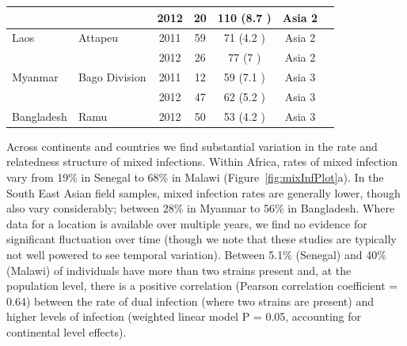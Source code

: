\documentclass[9pt,lineno]{elife}
\begin{document}
\begin{table}[bt]
\begin{tabular}{l l c c c c c}
                &               &2012 &20   &110  (8.7 )&Asia 2  \\
 \hline
Laos            &Attapeu        &2011 &59   &71   (4.2 )&Asia 2  \\
                &               &2012 &26   &77   (7   )&Asia 2  \\
 \hline
Myanmar         &Bago Division  &2011 &12   &59   (7.1 )&Asia 3  \\
                &               &2012 &47   &62   (5.2 )&Asia 3  \\
 \hline
Bangladesh      &Ramu           &2012 &50   &53   (4.2 )&Asia 3  \\
\bottomrule
\end{tabular}

\end{table}

Across continents and countries we find substantial variation in the rate and relatedness structure of mixed infections.  Within Africa, rates of mixed infection vary from 19\% in Senegal to 68\% in Malawi (Figure~\ref{fig:mixInfPlot}a).  In the South East Asian field samples, mixed infection rates are generally lower, though also vary considerably; between 28\% in Myanmar to 56\% in Bangladesh.  Where data for a location is available over multiple years, we find no evidence for significant fluctuation over time (though we note that these studies are typically not well powered to see temporal variation).  Between 5.1\% (Senegal) and 40\% (Malawi) of individuals have more than two strains present and, at the population level, there is a positive correlation (Pearson correlation coefficient = 0.64) between the rate of dual infection (where two strains are present) and higher levels of infection (weighted linear model P = 0.05, accounting for continental level effects).
\end{document}
